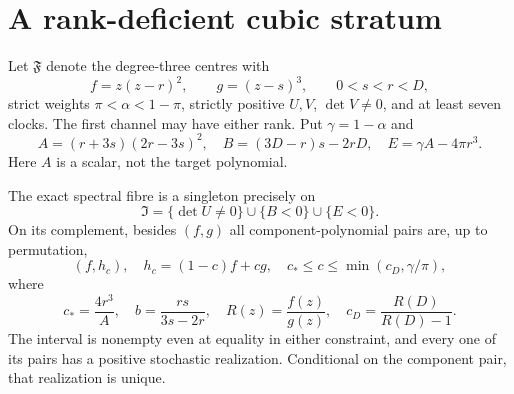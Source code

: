 \section{A rank-deficient cubic stratum}\label{sec:cubic}
Let $\mathfrak F$ denote the degree-three centres with
\[
 f=z(z-r)^2,\qquad g=(z-s)^3,\qquad 0<s<r<D,
\]
strict weights $\pi<\alpha<1-\pi$, strictly positive $U,V$, $\det V\ne0$,
and at least seven clocks. The first channel may have either rank. Put
$\gamma=1-\alpha$ and
\begin{equation}\label{eq:ABE}
 A=(r+3s)(2r-3s)^2,\quad B=(3D-r)s-2rD,\quad E=\gamma A-4\pi r^3.
\end{equation}
Here $A$ is a scalar, not the target polynomial.

\begin{theorem}\label{thm:cubic-fibre}
The exact spectral fibre is a singleton precisely on
\begin{equation}\label{eq:I}
 \mathfrak I=\{\det U\ne0\}\cup\{B<0\}\cup\{E<0\}.
\end{equation}
On its complement, besides $(f,g)$ all component-polynomial pairs are,
up to permutation,
\begin{equation}\label{eq:remote-interval}
 (f,h_c),\quad h_c=(1-c)f+cg,\quad
 c_*\le c\le\min(c_D,\gamma/\pi),
\end{equation}
where
\[
 c_*=\frac{4r^3}{A},\quad b=\frac{rs}{3s-2r},\quad
 R(z)=\frac{f(z)}{g(z)},\quad c_D=\frac{R(D)}{R(D)-1}.
\]
The interval is nonempty even at equality in either constraint, and
every one of its pairs has a positive stochastic realization. Conditional
on the component pair, that realization is unique.
\end{theorem}
